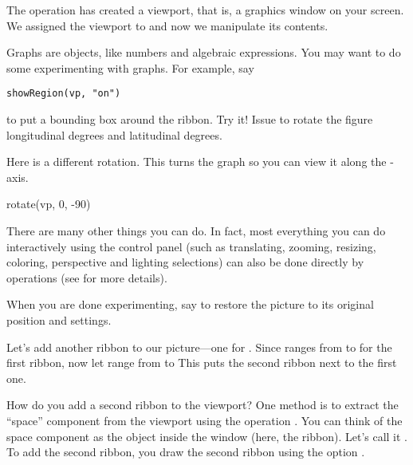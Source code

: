 The operation has created a viewport, that is, a graphics window
on your screen.
We assigned the viewport to  and now we manipulate
its contents.


Graphs are objects, like numbers and algebraic expressions.
You may want to do some experimenting with graphs.
For example, say
\begin{verbatim}
showRegion(vp, "on")
\end{verbatim}
to put a bounding box around the ribbon.
Try it!
Issue  to rotate the
figure  longitudinal degrees and  latitudinal
degrees.

\begin{psXtc}
\begin{xtccomment}
Here is a different rotation.
This turns the graph so you can view it along the -axis.
\end{xtccomment}
\begin{spadsrc}
rotate(vp, 0, -90)
\end{spadsrc}
\end{psXtc}

There are many other things you can do.
In fact, most everything you can do interactively using the
\threedim{} control panel (such as translating, zooming, resizing,
coloring, perspective and lighting selections) can also be done
directly by operations (see  for more details).

When you are done experimenting, say  to restore the
picture to its original position and settings.


Let's add another ribbon to our picture---one
for .
Since  ranges from  to  for the
first ribbon, now let  range from  to
This puts the second ribbon next to the first one.

How do you add a second ribbon to the viewport?
One method is
to extract the ``space'' component from the
viewport using the operation
.
You can think of the space component as the object inside the
window (here, the ribbon).
Let's call it .
To add the second ribbon, you draw the second ribbon using the
option .

